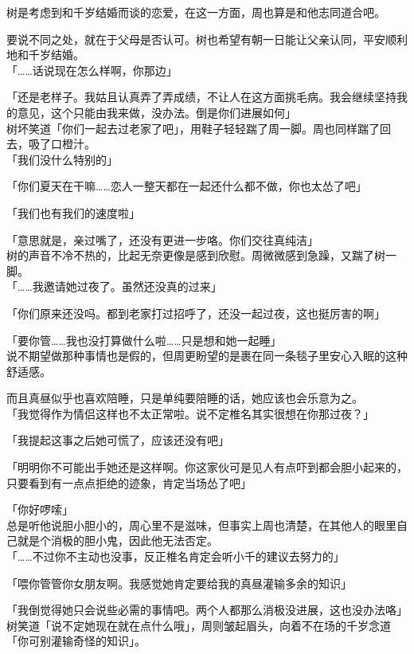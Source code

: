 树是考虑到和千岁结婚而谈的恋爱，在这一方面，周也算是和他志同道合吧。

要说不同之处，就在于父母是否认可。树也希望有朝一日能让父亲认同，平安顺利地和千岁结婚。\\

「……话说现在怎么样啊，你那边」

「还是老样子。我姑且认真弄了弄成绩，不让人在这方面挑毛病。我会继续坚持我的意见，这个只能由我来做，没办法。倒是你们进展如何」\\

树坏笑道「你们一起去过老家了吧」，用鞋子轻轻踹了周一脚。周也同样踹了回去，吸了口橙汁。\\

「我们没什么特别的」

「你们夏天在干嘛……恋人一整天都在一起还什么都不做，你也太怂了吧」

「我们也有我们的速度啦」

「意思就是，亲过嘴了，还没有更进一步咯。你们交往真纯洁」\\

树的声音不冷不热的，比起无奈更像是感到欣慰。周微微感到急躁，又踹了树一脚。\\

「……我邀请她过夜了。虽然还没真的过来」

「你们原来还没吗。都到老家打过招呼了，还没一起过夜，这也挺厉害的啊」

「要你管……我也没打算做什么啦……只是想和她一起睡」\\

说不期望做那种事情也是假的，但周更盼望的是裹在同一条毯子里安心入眠的这种舒适感。

而且真昼似乎也喜欢陪睡，只是单纯要陪睡的话，她应该也会乐意为之。\\

「我觉得作为情侣这样也不太正常啦。说不定椎名其实很想在你那过夜？」

「我提起这事之后她可慌了，应该还没有吧」

「明明你不可能出手她还是这样啊。你这家伙可是见人有点吓到都会胆小起来的，只要看到有一点点拒绝的迹象，肯定当场怂了吧」

「你好啰嗦」\\

总是听他说胆小胆小的，周心里不是滋味，但事实上周也清楚，在其他人的眼里自己就是个消极的胆小鬼，因此他无法否定。\\

「……不过你不主动也没事，反正椎名肯定会听小千的建议去努力的」

「喂你管管你女朋友啊。我感觉她肯定要给我的真昼灌输多余的知识」

「我倒觉得她只会说些必需的事情吧。两个人都那么消极没进展，这也没办法咯」\\

树笑道「说不定她现在就在点什么哦」，周则皱起眉头，向着不在场的千岁念道「你可别灌输奇怪的知识」。
